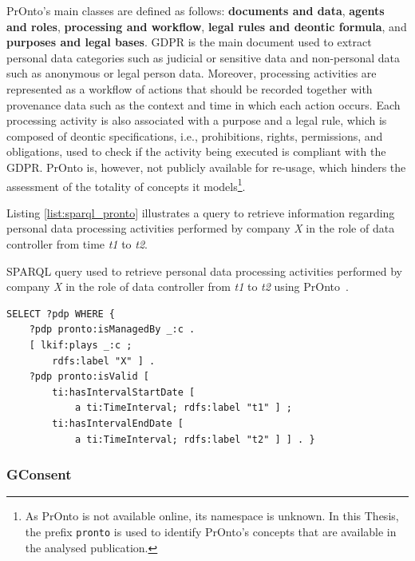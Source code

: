 PrOnto's main classes are defined as follows: \textbf{documents and data}, \textbf{agents and roles}, \textbf{processing and workflow}, \textbf{legal rules and deontic formula}, and \textbf{purposes and legal bases}.
GDPR is the main document used to extract personal data categories such as judicial or sensitive data and non-personal data such as anonymous or legal person data.
Moreover, processing activities are represented as a workflow of actions that should be recorded together with provenance data such as the context and time in which each action occurs.
Each processing activity is also associated with a purpose and a legal rule, which is composed of deontic specifications, i.e., prohibitions, rights, permissions, and obligations, used to check if the activity being executed is compliant with the GDPR. PrOnto is, however, not publicly available for re-usage, which hinders the assessment of the totality of concepts it models\footnote{As PrOnto is not available online, its namespace is unknown. In this Thesis, the prefix \texttt{pronto} is used to identify PrOnto's concepts that are available in the analysed publication.}. 

Listing \ref{list:sparql_pronto} illustrates a query to retrieve information regarding personal data processing activities performed by company \textit{X} in the role of data controller from time \textit{t1} to \textit{t2}.

\begin{listing}[ht]
\caption[SPARQL query with PrOnto.]{SPARQL query used to retrieve personal data processing activities performed by company \textit{X} in the role of data controller from \textit{t1} to \textit{t2} using PrOnto~\citep{ko_pronto_2018}.}
\label{list:sparql_pronto}
\begin{verbatim}
SELECT ?pdp WHERE {
    ?pdp pronto:isManagedBy _:c .
    [ lkif:plays _:c ;
        rdfs:label "X" ] .
    ?pdp pronto:isValid [
        ti:hasIntervalStartDate [ 
            a ti:TimeInterval; rdfs:label "t1" ] ;
        ti:hasIntervalEndDate [ 
            a ti:TimeInterval; rdfs:label "t2" ] ] . }
\end{verbatim}
\end{listing}

\subsubsection{GConsent}
\label{sec:gconsent}

